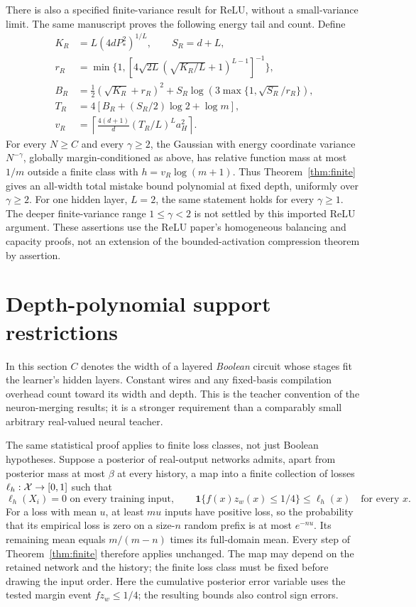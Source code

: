 \documentclass[11pt]{article}
\theoremstyle{remark}\newtheorem{remark}[theorem]{Remark}
\begin{document}
There is also a specified finite-variance result for ReLU, without a
small-variance limit. The same manuscript proves the following energy
tail and count. Define
\begin{align*}
 K_R&=L(4dP_*^2)^{1/L},\qquad S_R=d+L,\\
 r_R&=\min\{1,[4\sqrt{2L}(\sqrt{K_R/L}+1)^{L-1}]^{-1}\},\\
 B_R&=\tfrac12(\sqrt{K_R}+r_R)^2+
       S_R\log\left(3\max\{1,\sqrt{S_R}/r_R\}\right),\\
 T_R&=4[B_R+(S_R/2)\log2+\log m],\\
 v_R&=\left\lceil\frac{4(d+1)}d(T_R/L)^La_H^2\right\rceil.
\end{align*}
For every $N\ge C$ and every $\gamma\ge2$, the Gaussian with energy
coordinate variance $N^{-\gamma}$, globally margin-conditioned as above,
has relative function mass at most $1/m$ outside a finite class with
$h=v_R\log(m+1)$. Thus Theorem~\ref{thm:finite} gives an all-width total
mistake bound polynomial at fixed depth, uniformly over $\gamma\ge2$.
For one hidden layer, $L=2$, the same statement holds for every
$\gamma\ge1$. The deeper finite-variance range $1\le\gamma<2$ is not
settled by this imported ReLU argument. These assertions use the
ReLU paper's homogeneous balancing and capacity proofs, not an extension
of the bounded-activation compression theorem by assertion.

\section{Depth-polynomial support restrictions}\label{sec:depth}

In this section $C$ denotes the width of a layered \emph{Boolean} circuit
whose stages fit the learner's hidden layers. Constant wires and any
fixed-basis compilation overhead count toward its width and depth. This
is the teacher convention of the neuron-merging results; it is a stronger
requirement than a comparably small arbitrary real-valued neural teacher.

The same statistical proof applies to finite loss classes, not just
Boolean hypotheses. Suppose a posterior of real-output networks admits,
apart from posterior mass at most $\beta$ at every history, a map into
a finite collection of losses $\ell_h:\mathcal X\to[0,1]$ such that
\[
 \ell_h(X_i)=0\text{ on every training input},\qquad
 \mathbf1\{f(x)z_w(x)\le1/4\}\le\ell_h(x)\quad\text{for every }x.
\]
For a loss with mean $u$, at least $mu$ inputs have positive loss, so the
probability that its empirical loss is zero on a size-$n$ random prefix
is at most $e^{-nu}$. Its remaining mean equals $m/(m-n)$ times its
full-domain mean. Every step of Theorem~\ref{thm:finite} therefore applies
unchanged. The map may depend on the retained network and the history;
the finite loss class must be fixed before drawing the input order. Here
the cumulative posterior error variable uses the tested margin event
$fz_w\le1/4$; the resulting bounds also control sign errors.
\end{document}

